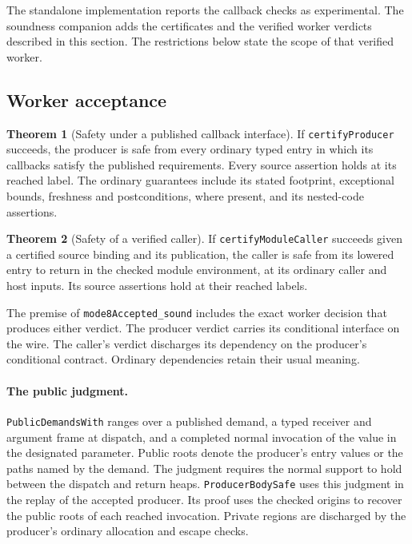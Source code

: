 \documentclass[10pt,a4paper]{article}
\theoremstyle{definition}
\newtheorem{theorem}{Theorem}
\newcommand{\lean}[1]{\textcolor{leanc}{\texttt{\small #1}}}
\begin{document}
The standalone implementation reports the callback checks as experimental.
The soundness companion adds the certificates and the verified worker
verdicts described in this section. The restrictions below state the scope
of that verified worker.

\subsection{Worker acceptance}

\begin{theorem}[Safety under a published callback interface]
If \lean{certifyProducer} succeeds, the producer is safe from every
ordinary typed entry in which its callbacks satisfy the published
requirements. Every source assertion holds at its reached label. The
ordinary guarantees include its stated footprint, exceptional bounds,
freshness and postconditions, where present, and its nested-code assertions.
\end{theorem}

\begin{theorem}[Safety of a verified caller]
If \lean{certifyModuleCaller} succeeds given a certified source binding
and its publication, the caller is safe from its lowered entry to
return in the checked module environment, at its ordinary caller and host
inputs. Its source assertions hold at their reached labels.
\end{theorem}

The premise of \lean{mode8Accepted\_sound} includes the exact worker
decision that produces either verdict. The producer verdict carries its
conditional interface on the wire. The caller's verdict discharges its
dependency on the producer's conditional contract. Ordinary dependencies
retain their usual meaning.

\paragraph{The public judgment.}
\lean{PublicDemandsWith} ranges over a published demand, a typed receiver
and argument frame at dispatch, and a completed normal invocation of the
value in the designated parameter. Public roots denote the producer's
entry values or the paths named by the demand. The judgment requires the
normal support to hold between the dispatch and return heaps.
\lean{ProducerBodySafe} uses this judgment in the replay of the accepted
producer. Its proof uses the checked origins to recover the public roots
of each reached invocation. Private regions are discharged by the
producer's ordinary allocation and escape checks.
\end{document}
